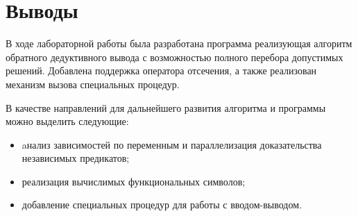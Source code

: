 \chapter*{Выводы}

В ходе лабораторной работы была разработана программа реализующая алгоритм обратного дедуктивного вывода с возможностью полного перебора допустимых решений. Добавлена поддержка оператора отсечения, а также реализован механизм вызова специальных процедур.

В качестве направлений для дальнейшего развития алгоритма и программы можно выделить следующие:
\begin{itemize}[label=---]
  \item aнализ зависимостей по переменным и параллелизация доказательства независимых предикатов;
  \item реализация вычислимых функциональных символов;
  \item добавление специальных процедур для работы с вводом-выводом.
\end{itemize}
